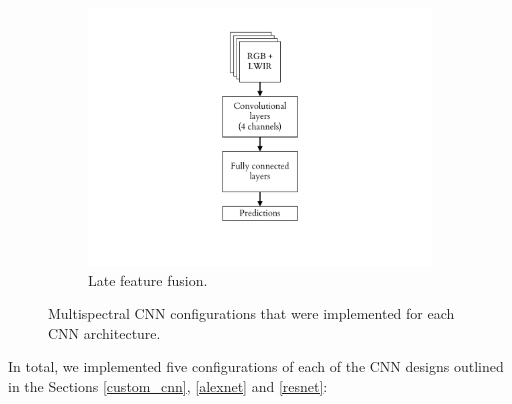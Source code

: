 \documentclass{l4proj}
\begin{document}
\begin{figure}[ht]
\begin{subfigure}[h!]{0.3\textwidth}
    \includegraphics[width=\textwidth, page={3}, trim={6.5cm 2.2cm 6.5cm 1.5cm}, clip]{images/models/archs}
    \caption{Late feature fusion.}
    \label{fig:arch_fusion}
  \end{subfigure}
  \caption{Multispectral CNN configurations that were implemented for each CNN architecture.}
  \label{fig:archs}
\end{figure}

In total, we implemented five configurations of each of the CNN designs outlined in the Sections \ref{custom_cnn}, \ref{alexnet} and \ref{resnet}:
\end{document}
